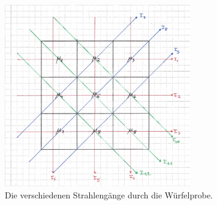 \begin{figure}
  \centering
  \includegraphics[height=8.0cm]{content/wuerfelpos.pdf} %
  \caption{Die verschiedenen Strahlengänge durch die Würfelprobe.}
  \label{fig:wuerfelpos}
\end{figure}
